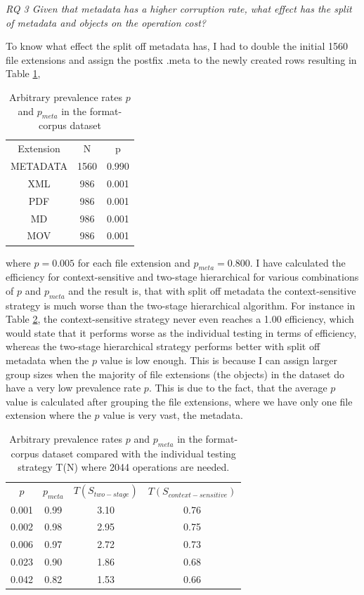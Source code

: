 \textit{RQ 3 Given that metadata has a higher corruption rate, what effect has the split of metadata and objects on the operation cost?}

To know what effect the split off metadata has, I had to double the initial 1560 file extensions and assign the postfix .meta to the newly created rows resulting in Table \ref{tb:metadata},
\begin{table}[b]
    \caption{Arbitrary prevalence rates $p$ and $p_{meta}$ in the format-corpus dataset}
    \centering
    \begin{tabular}{c c c}
    \label{tb:metadata}
    Extension & N & p\\
    METADATA & 1560 & 0.990 \\
    XML& 986 & 0.001 \\
    PDF& 986 & 0.001 \\
    MD& 986 & 0.001 \\
    MOV& 986 & 0.001 
    \end{tabular}
\end{table}
where $p=0.005$ for each file extension and $p_{meta}=0.800$. 
I have calculated the efficiency for context-sensitive and two-stage hierarchical for various combinations of $p$ and $p_{meta}$ and the result is, that with split off metadata the context-sensitive strategy is much worse than the two-stage hierarchical algorithm.
For instance in Table \ref{tb:split-off}, the context-sensitive strategy never even reaches a 1.00 efficiency, which would state that it performs worse as the individual testing in terms of efficiency, whereas the two-stage hierarchical strategy performs better with split off metadata when the $p$ value is low enough. This is because I can assign larger group sizes when the majority of file extensions (the objects) in the dataset do have a very low prevalence rate $p$. This is due to the fact, that the average $p$ value is calculated after grouping the file extensions, where we have only one file extension where the $p$ value is very vast, the metadata.
\begin{table}[b]
    \caption{Arbitrary prevalence rates $p$ and $p_{meta}$ in the format-corpus dataset compared with the individual testing strategy T(N) where 2044 operations are needed.}
    \centering
    \begin{tabular}{c c c c}
    \label{tb:split-off}
    $p$ & $p_{meta}$ & $T(S_{two-stage})$ & $T(S_{context-sensitive})$\\
    0.001 &0.99 & 3.10 & 0.76\\
    0.002 &0.98 & 2.95 & 0.75\\
    0.006 &0.97 & 2.72 & 0.73\\
    0.023 &0.90 & 1.86 & 0.68\\
    0.042 &0.82 & 1.53 & 0.66
    \end{tabular}
\end{table}


